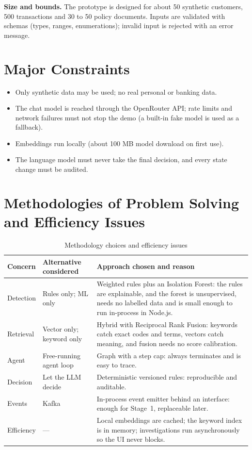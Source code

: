 \documentclass[oneside,a4paper,12pt]{report}
\begin{document}
\textbf{Size and bounds.} The prototype is designed for about 50 synthetic customers, 500 transactions and 30 to 50 policy documents. Inputs are validated with schemas (types, ranges, enumerations); invalid input is rejected with an error message.

\section{Major Constraints}
\begin{itemize}
  \item Only synthetic data may be used; no real personal or banking data.
  \item The chat model is reached through the OpenRouter API; rate limits and network failures must not stop the demo (a built-in fake model is used as a fallback).
  \item Embeddings run locally (about 100 MB model download on first use).
  \item The language model must never take the final decision, and every state change must be audited.
\end{itemize}

\section{Methodologies of Problem Solving and Efficiency Issues}
\begin{table}[H]
\centering\small
\begin{tabularx}{\textwidth}{|l|X|X|}
\hline
\textbf{Concern} & \textbf{Alternative considered} & \textbf{Approach chosen and reason} \\ \hline
Detection & Rules only; ML only & Weighted rules plus an Isolation Forest: the rules are explainable, and the forest is unsupervised, needs no labelled data and is small enough to run in-process in Node.js. \\ \hline
Retrieval & Vector only; keyword only & Hybrid with Reciprocal Rank Fusion: keywords catch exact codes and terms, vectors catch meaning, and fusion needs no score calibration. \\ \hline
Agent & Free-running agent loop & Graph with a step cap: always terminates and is easy to trace. \\ \hline
Decision & Let the LLM decide & Deterministic versioned rules: reproducible and auditable. \\ \hline
Events & Kafka & In-process event emitter behind an interface: enough for Stage~1, replaceable later. \\ \hline
Efficiency & --- & Local embeddings are cached; the keyword index is in memory; investigations run asynchronously so the UI never blocks. \\ \hline
\end{tabularx}
\caption{Methodology choices and efficiency issues}
\end{table}
\end{document}
